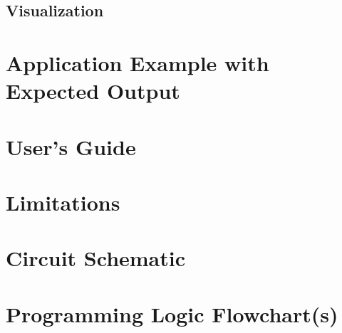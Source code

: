 \documentclass[12pt, letterpaper]{article}
\begin{document}
\subsection{Visualization}
\section{Application Example with Expected Output}
\section{User's Guide}
\section{Limitations}
\section{Circuit Schematic}
\section{Programming Logic Flowchart(s)}
\end{document}
